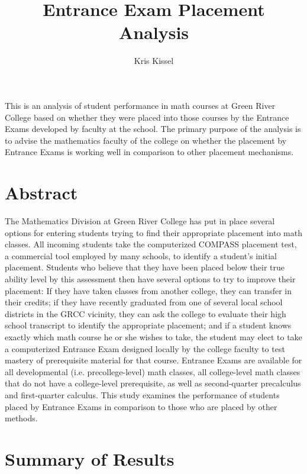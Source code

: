 \documentclass[twoside]{article}\usepackage[]{graphicx}\usepackage[]{color}
\begin{document}
\title{Entrance Exam Placement Analysis}
\author{Kris Kissel}


\maketitle


\bigskip

This is an analysis of student performance in math courses at Green River College based on whether they were placed into those courses by the Entrance Exams developed by faculty at the school.  The primary purpose of the analysis is to advise the mathematics faculty of the college on whether the placement by Entrance Exams is working well in comparison to other placement mechanisms.

\section{Abstract}

The Mathematics Division at Green River College has put in place several options for entering students trying to find their appropriate placement into math classes.  All incoming students take the computerized COMPASS placement test, a commercial tool employed by many schools, to identify a student's initial placement.  Students who believe that they have been placed below their true ability level by this assessment then have several options to try to improve their placement: If they have taken classes from another college, they can transfer in their credits; if they have recently graduated from one of several local school districts in the GRCC vicinity, they can ask the college to evaluate their high school transcript to identify the appropriate placement; and if a student knows exactly which math course he or she wishes to take, the student may elect to take a computerized Entrance Exam designed locally by the college faculty to test mastery of prerequisite material for that course.  Entrance Exams are available for all developmental (i.e. precollege-level) math classes, all college-level math classes that do not have a college-level prerequisite, as well as second-quarter precalculus and first-quarter calculus.  This study examines the performance of students placed by Entrance Exams in comparison to those who are placed by other methods.  


\section{Summary of Results}
\end{document}
